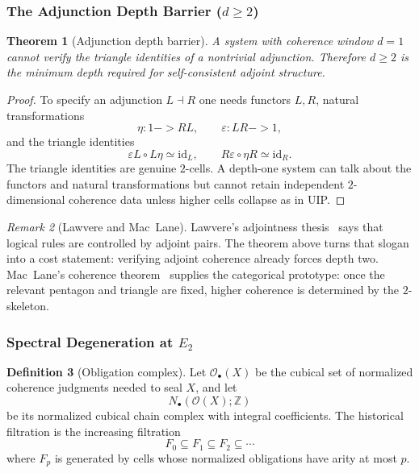 \documentclass[11pt,a4paper]{article}
\def\to{->}%
\theoremstyle{plain}
\newtheorem{theorem}{Theorem}[section]
\theoremstyle{definition}
\newtheorem{definition}[theorem]{Definition}
\theoremstyle{remark}
\newtheorem{remark}[theorem]{Remark}
\newcommand{\Z}{\mathbb{Z}}
\newcommand{\Ocal}{\mathcal{O}}
\begin{document}
\subsubsection{\texorpdfstring{The Adjunction Depth Barrier ($d\ge 2$)}{The Adjunction Depth Barrier}}

\begin{theorem}[Adjunction depth barrier]
\label{thm:adjunction}
A system with coherence window $d=1$ cannot verify the triangle identities of a nontrivial adjunction.  Therefore $d\ge 2$ is the minimum depth required for self-consistent adjoint structure.
\end{theorem}

\begin{proof}
To specify an adjunction $L\dashv R$ one needs functors $L,R$, natural transformations
\[
  \eta:1\to RL,\qquad \varepsilon:LR\to 1,
\]
and the triangle identities
\[
  \varepsilon L\circ L\eta \simeq \mathrm{id}_L,
  \qquad
  R\varepsilon\circ \eta R \simeq \mathrm{id}_R.
\]
The triangle identities are genuine $2$-cells.  A depth-one system can talk about the functors and natural transformations but cannot retain independent $2$-dimensional coherence data unless higher cells collapse as in UIP.
\end{proof}

\begin{remark}[Lawvere and Mac~Lane]
\label{rem:lawvere-maclane}
Lawvere's adjointness thesis~\cite{lawvere-adjoint} says that logical rules are controlled by adjoint pairs.  The theorem above turns that slogan into a cost statement: verifying adjoint coherence already forces depth two.  Mac~Lane's coherence theorem~\cite{maclane-coherence} supplies the categorical prototype: once the relevant pentagon and triangle are fixed, higher coherence is determined by the $2$-skeleton.
\end{remark}

\subsubsection{\texorpdfstring{Spectral Degeneration at $E_2$}{Spectral Degeneration at E2}}

\begin{definition}[Obligation complex]
\label{def:obligation-complex}
Let $\Ocal_\bullet(X)$ be the cubical set of normalized coherence judgments needed to seal $X$, and let
\[
  N_\bullet(\Ocal(X);\Z)
\]
be its normalized cubical chain complex with integral coefficients.  The historical filtration is the increasing filtration
\[
  F_0\subseteq F_1\subseteq F_2\subseteq \cdots
\]
where $F_p$ is generated by cells whose normalized obligations have arity at most $p$.
\end{definition}
\end{document}
